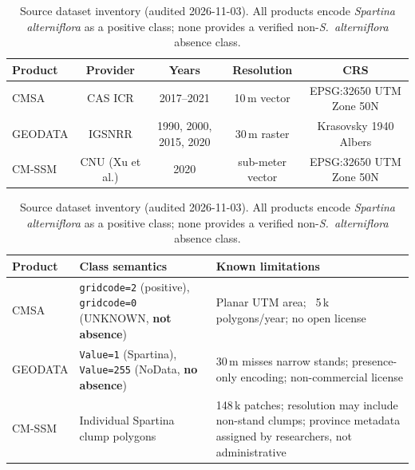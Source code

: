 \begin{table}[htpb]
\centering
\caption{\label{tab:datasets}Source dataset inventory (audited 2026-11-03).
  All products encode \textit{Spartina alterniflora} as a positive class;
  none provides a verified non-\textit{S.~alterniflora} absence class.}
\small
\begin{tabular}{l c c c c}
\toprule
Product & Provider & Years & Resolution & CRS \\
\midrule
CMSA & CAS ICR & 2017--2021 & 10\,m vector & EPSG:32650 UTM Zone 50N \\
GEODATA & IGSNRR & 1990, 2000, 2015, 2020 & 30\,m raster & Krasovsky 1940 Albers \\
CM-SSM & CNU (Xu et al.) & 2020 & sub-meter vector & EPSG:32650 UTM Zone 50N \\
\bottomrule
\end{tabular}

\vspace{1em}
\begin{tabular}{l p{} p{}}
\toprule
Product & Class semantics & Known limitations \\
\midrule
CMSA & \texttt{gridcode=2} (positive), \texttt{gridcode=0} (UNKNOWN, \textbf{not absence}) & Planar UTM area; ~5\,k polygons/year; no open license \\
GEODATA & \texttt{Value=1} (Spartina), \texttt{Value=255} (NoData, \textbf{no absence}) & 30\,m misses narrow stands; presence-only encoding; non-commercial license \\
CM-SSM & Individual Spartina clump polygons & 148\,k patches; resolution may include non-stand clumps; province metadata assigned by researchers, not administrative \\
\bottomrule
\end{tabular}
\end{table}
